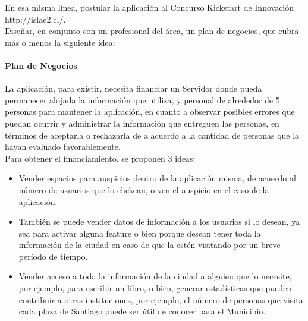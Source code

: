 \documentclass[10pt,letterpaper]{article}
\begin{document}
En esa misma línea, postular la aplicación al Concurso Kickstart de Innovación http://islae2.cl/.\\

Diseñar, en conjunto con un profesional del área, un plan de negocios, que cubra más o menos la siguiente idea:\\

\paragraph{Plan de Negocios}

La aplicación, para existir, necesita financiar un Servidor donde pueda permanecer alojada la información que utiliza, y personal de alrededor de 5 personas para mantener la aplicación, en cuanto a observar posibles errores que puedan ocurrir y administrar la información que entreguen las personas, en términos de aceptarla o rechazarla de a acuerdo a la cantidad de personas que la hayan evaluado favorablemente.\\

Para obtener el financiamiento, se proponen 3 ideas:\\

\begin{itemize}
 \item Vender espacios para auspicios dentro de la aplicación misma, de acuerdo al número de usuarios que lo clickean, o ven el auspicio en el caso de la aplicación.

 \item También se puede vender datos de información a los usuarios si lo desean, ya sea para activar alguna feature o bien porque desean tener toda la información de la ciudad en caso de que la estén visitando por un breve período de tiempo.

 \item Vender acceso a toda la información de la ciudad a alguien que lo necesite, por ejemplo, para escribir un libro, o bien, generar estadísticas que pueden contribuir a otras instituciones, por ejemplo, el número de personas que visita cada plaza de Santiago puede ser útil de conocer para el Municipio.
\end{itemize}
\end{document}
